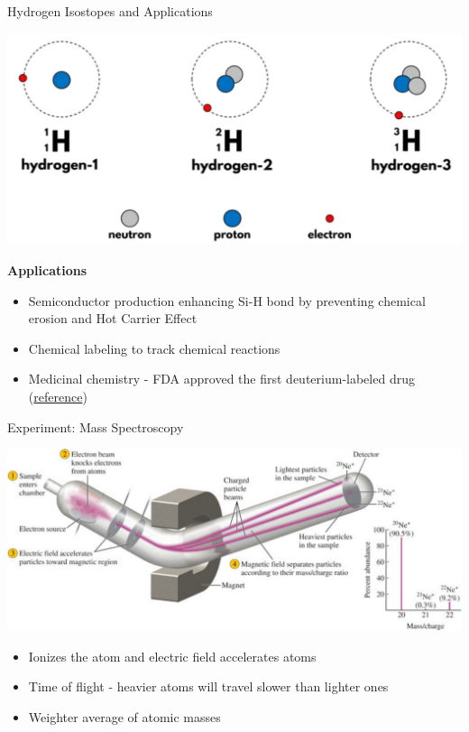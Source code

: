 \documentclass[11pt]{beamer}
\begin{document}
\begin{frame}{Hydrogen Isostopes and Applications}
  \begin{center}
    \includegraphics[width=0.75\linewidth]{hydro_iso}
  \end{center}

  \textbf{Applications}
  
  \begin{itemize}
  \item Semiconductor production enhancing Si-H bond by preventing
    chemical erosion and Hot Carrier Effect
  \item Chemical labeling to track chemical reactions
  \item Medicinal chemistry - FDA approved the first deuterium-labeled
    drug (\href{https://pubs.acs.org/doi/10.1021/acs.jmedchem.8b01808}{reference})
  \end{itemize}
\end{frame}

\begin{frame}{Experiment: Mass Spectroscopy}
  \begin{center}
    \includegraphics[width=\linewidth]{mass_spect}
  \end{center}

  \begin{itemize}
  \item Ionizes the atom and electric field accelerates atoms
  \item Time of flight - heavier atoms will travel slower
    than lighter ones
  \item Weighter average of atomic masses
  \end{itemize}  
\end{frame}
\end{document}
